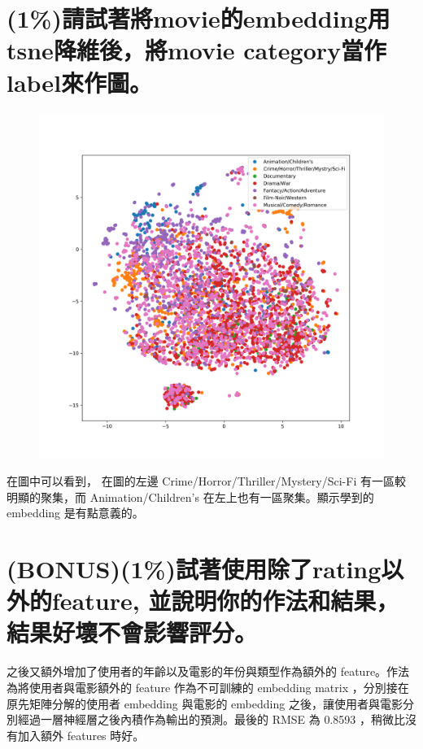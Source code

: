 \documentclass[fleqn,a4paper,12pt]{article}
\begin{document}
\section{(1\%)請試著將movie的embedding用tsne降維後，將movie category當作label來作圖。}

\begin{figure}[H]
\centering
\includegraphics[width=\linewidth]{tsne.png}
\label{fig:p1.1}
\end{figure}

在圖中可以看到， 在圖的左邊 Crime/Horror/Thriller/Mystery/Sci-Fi 有一區較明顯的聚集，而 Animation/Children's 在左上也有一區聚集。顯示學到的 embedding 是有點意義的。

\section{(BONUS)(1\%)試著使用除了rating以外的feature, 並說明你的作法和結果，結果好壞不會影響評分。}

之後又額外增加了使用者的年齡以及電影的年份與類型作為額外的 feature。作法為將使用者與電影額外的 feature 作為不可訓練的 embedding matrix ，分別接在原先矩陣分解的使用者 embedding 與電影的 embedding 之後，讓使用者與電影分別經過一層神經層之後內積作為輸出的預測。最後的 RMSE 為 0.8593 ，稍微比沒有加入額外 features 時好。
\end{document}
